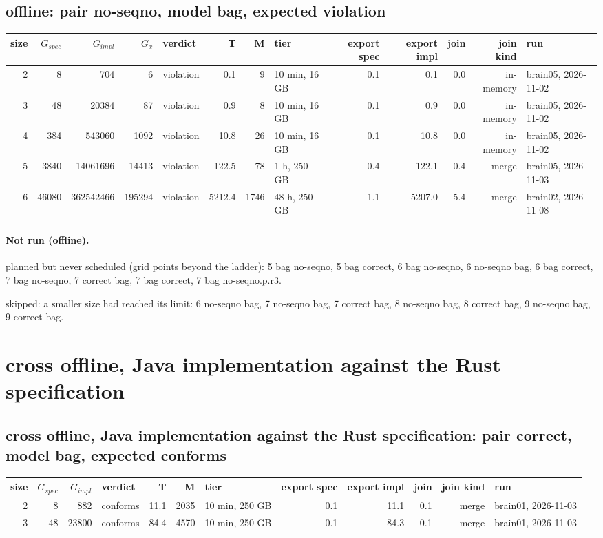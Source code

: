 \documentclass[10pt]{article}
\begin{document}
\subsection*{offline: pair \textsf{no-seqno}, model bag, expected violation}
\begin{longtable}{@{}rrrrlrrlrrrrl@{}}
\toprule
size & $G_{\mathit{spec}}$ & $G_{\mathit{impl}}$ & $G_x$ & verdict & T & M & tier & export spec & export impl & join & join kind & run \\
\midrule
\endhead
\color{red} 2 & 8 & 704 & 6 & violation & 0.1 & 9 & 10 min, 16 GB & 0.1 & 0.1 & 0.0 & in-memory & brain05, 2026-11-02 \\
\color{red} 3 & 48 & 20384 & 87 & violation & 0.9 & 8 & 10 min, 16 GB & 0.1 & 0.9 & 0.0 & in-memory & brain05, 2026-11-02 \\
\color{red} 4 & 384 & 543060 & 1092 & violation & 10.8 & 26 & 10 min, 16 GB & 0.1 & 10.8 & 0.0 & in-memory & brain05, 2026-11-02 \\
\color{blue} 5 & 3840 & 14061696 & 14413 & violation & 122.5 & 78 & 1 h, 250 GB & 0.4 & 122.1 & 0.4 & merge & brain05, 2026-11-03 \\
\color{blue} 6 & 46080 & 362542466 & 195294 & violation & 5212.4 & 1746 & 48 h, 250 GB & 1.1 & 5207.0 & 5.4 & merge & brain02, 2026-11-08 \\
\bottomrule
\end{longtable}
\paragraph{Not run (offline).}
planned but never scheduled (grid points beyond the ladder): 5 bag no-seqno, 5 bag correct, 6 bag no-seqno, 6 no-seqno bag, 6 bag correct, 7 bag no-seqno, 7 correct bag, 7 bag correct, 7 bag no-seqno.p.r3.\par
skipped: a smaller size had reached its limit: 6 no-seqno bag, 7 no-seqno bag, 7 correct bag, 8 no-seqno bag, 8 correct bag, 9 no-seqno bag, 9 correct bag.\par
\section*{cross offline, Java implementation against the Rust specification}
\subsection*{cross offline, Java implementation against the Rust specification: pair \textsf{correct}, model bag, expected conforms}
\begin{longtable}{@{}rrrlrrlrrrrl@{}}
\toprule
size & $G_{\mathit{spec}}$ & $G_{\mathit{impl}}$ & verdict & T & M & tier & export spec & export impl & join & join kind & run \\
\midrule
\endhead
\color{blue} 2 & 8 & 882 & conforms & 11.1 & 2035 & 10 min, 250 GB & 0.1 & 11.1 & 0.1 & merge & brain01, 2026-11-03 \\
\color{blue} 3 & 48 & 23800 & conforms & 84.4 & 4570 & 10 min, 250 GB & 0.1 & 84.3 & 0.1 & merge & brain01, 2026-11-03 \\
\bottomrule
\end{longtable}
\end{document}
